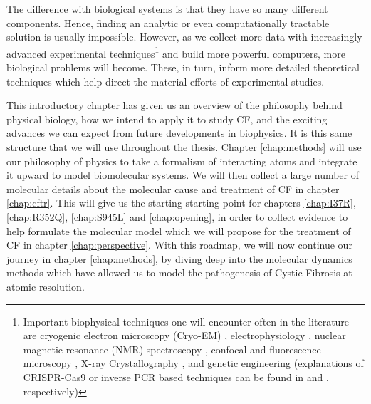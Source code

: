 The difference with biological systems is that they have so many different components. Hence, finding an analytic or even computationally tractable solution is usually impossible. However, as we collect more data with increasingly advanced experimental techniques\footnote{Important biophysical techniques one will encounter often in the literature are cryogenic electron microscopy (Cryo-EM) \cite{cheng2015, callaway2015, callaway2020}, electrophysiology \cite{aidley1996}, nuclear magnetic resonance (NMR) spectroscopy \cite{marion2013}, confocal and fluorescence microscopy \cite{sanderson2014}, X-ray Crystallography \cite{frauenfelder2010, drenth2006}, and genetic engineering (explanations of CRISPR-Cas9 or inverse PCR based techniques can be found in \cite{silva2017} and \cite{crispr2019}, respectively)} and build more powerful computers, more biological problems will become. These, in turn, inform more detailed theoretical techniques which help direct the material efforts of experimental studies. 

This introductory chapter has given us an overview of the philosophy behind physical biology, how we intend to apply it to study CF, and the exciting advances we can expect from future developments in biophysics. It is this same structure that we will use throughout the thesis. Chapter \ref{chap:methods} will use our philosophy of physics to take a formalism of interacting atoms and integrate it upward to model biomolecular systems. We will then collect a large number of molecular details about the molecular cause and treatment of CF in chapter \ref{chap:cftr}. This will give us the starting starting point for chapters \ref{chap:I37R}, \ref{chap:R352Q}, \ref{chap:S945L} and \ref{chap:opening}, in order to collect evidence to help formulate the molecular model which we will propose for the treatment of CF in chapter \ref{chap:perspective}. With this roadmap, we will now continue our journey in chapter \ref{chap:methods}, by diving deep into the molecular dynamics methods which have allowed us to model the pathogenesis of Cystic Fibrosis at atomic resolution.


